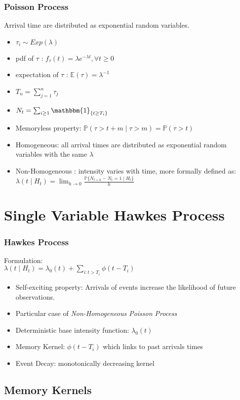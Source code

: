 \documentclass{beamer}
\begin{document}
\begin{frame}
\frametitle{Poisson Process}
Arrival time are distributed as exponential random variables.
\begin{itemize}
	\item $\tau_i \sim Exp(\lambda)$
	\item pdf of $\tau$ : $f_{\tau}(t) = \lambda e^{-\lambda t}, \forall t \ge 0$
	\item expectation of $\tau$ : $\mathbb{E}(\tau) = \lambda^{-1}$
	\item $T_n = \sum_{j=1}^n \tau_j$
	\item $N_t = \sum_{i \ge 1} \mathbbm{1}_{\{ t \ge T_i\}}$
	\item Memoryless property: $\mathbb{P}(\tau > t + m \mid \tau > m) = \mathbb{P}(\tau > t)$
	\item Homogeneous: all arrival times are distributed as exponential random variables with the same $\lambda$
	\item Non-Homogeneous : intensity varies with time, more formally defined as: $\lambda(t \mid H_t) = \lim_{h \to 0} \frac{\mathbb{P}\{ N_{t + h} - N_t = 1 \mid H_t\}}{h}$
\end{itemize}
\end{frame}

\section{Single Variable Hawkes Process}

\begin{frame}
\frametitle{Hawkes Process}
Formulation:\\
$\lambda(t \mid H_t) = \lambda_0(t) + \sum_{i: t > T_i} \phi(t - T_i)$
\begin{itemize}
	\item Self-exciting property: Arrivals of events increase the likelihood of future observations.
	\item Particular case of \textit{Non-Homogeneous Poisson Process}
	\item Deterministic base intensity function: $\lambda_0(t)$
	\item Memory Kernel: $\phi(t - T_i)$ which links to past arrivals times
	\item Event Decay: monotonically decreasing kernel
\end{itemize}
\end{frame}

\subsection{Memory Kernels}
\end{document}
